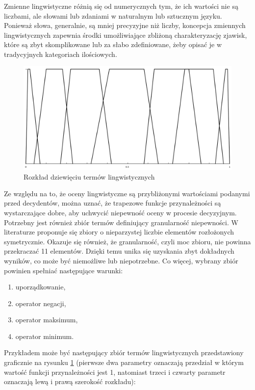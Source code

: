 Zmienne lingwistyczne różnią się od numerycznych tym, że ich wartości nie są
liczbami, ale słowami lub zdaniami w naturalnym lub sztucznym języku. Ponieważ
słowa, generalnie, są mniej precyzyjne niż liczby, koncepcja zmiennych
lingwistycznych zapewnia środki umożliwiające zbliżoną charakteryzację zjawisk,
które są zbyt skomplikowane lub za słabo zdefiniowane, żeby opisać je w
tradycyjnych kategoriach ilościowych.
\begin{figure}[ht]
  \includegraphics[width=\linewidth]
    {chapters/preferences/zbior_termow}
  \caption{Rozkład dziewięciu termów lingwistycznych}
  \label{fig:rozklad_dziewieciu_termow_lingwistycznych}
\end{figure}
Ze względu na to, że oceny lingwistyczne są przybliżonymi wartościami podanymi
przed decydentów, można uznać, że trapezowe funkcje przynależności są
wystarczające dobre, aby uchwycić niepewność oceny w procesie decyzyjnym.
Potrzebny jest również zbiór termów definiujący granularność niepewności. W
literaturze \cite{Herrera1995} proponuje się zbiory o nieparzystej liczbie
elementów rozłożonych symetrycznie. Okazuje się również, że granularność, czyli moc zbioru, nie
powinna przekraczać 11 elementów. Dzięki temu unika się uzyskania zbyt
dokładnych wyników, co może być niemożliwe lub niepotrzebne. Co więcej, wybrany
zbiór powinien spełniać następujące warunki:
\begin{enumerate}[1)]
  \item uporządkowanie,
  \item operator negacji,
  \item operator maksimum,
  \item operator minimum.
\end{enumerate}

Przykładem może być następujący zbiór termów lingwistycznych przedstawiony
graficznie na rysunku \ref{fig:rozklad_dziewieciu_termow_lingwistycznych}
(pierwsze dwa parametry oznaczają przedział w którym wartość funkcji
przynależności jest 1, natomiast trzeci i czwarty parametr oznaczają lewą i
prawą szerokość rozkładu):

